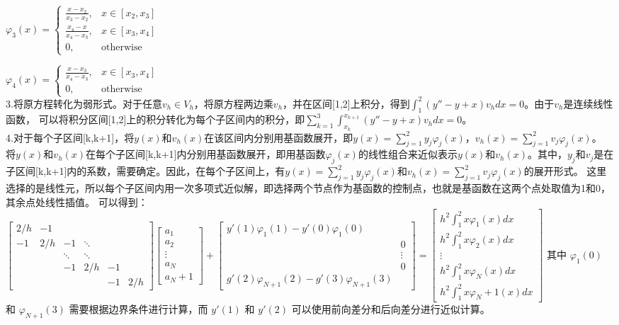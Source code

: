 \documentclass[12pt, a4paper, oneside]{ctexart}
\begin{document}
\begin{spacing}{2.0}
$\varphi_3(x)=\begin{cases}
    \frac{x-x_2}{x_3-x_2}, & x\in[x_2,x_3]\\
    \frac{x_4-x}{x_4-x_3}, & x\in[x_3,x_4]\\
    0, & \text{otherwise}
\end{cases}$

$\varphi_4(x)=\begin{cases}
    \frac{x-x_3}{x_4-x_3}, & x\in[x_3,x_4]\\
    0, & \text{otherwise}
\end{cases}$
\\
3.将原方程转化为弱形式。对于任意$v_h\in V_h$，将原方程两边乘$v_h$，并在区间[1,2]上积分，得到$\int_1^2(y''-y+x)v_hdx=0$。由于$v_h$是连续线性函数，
可以将积分区间[1,2]上的积分转化为每个子区间内的积分，即$\displaystyle\sum_{k=1}^{3}\int_{x_k}^{x_{k+1}}(y''-y+x)v_hdx=0$。
\\
4.对于每个子区间[k,k+1]，将$y(x)$和$v_h(x)$在该区间内分别用基函数展开，即$\displaystyle y(x)=\sum_{j=1}^{2}y_j\varphi_j(x)$，$ \displaystyle v_h(x)=\sum_{j=1}^{2}v_j\varphi_j(x)$。
将$y(x)$和$v_h(x)$在每个子区间[k,k+1]内分别用基函数展开，即用基函数$\varphi_j(x)$的线性组合来近似表示$y(x)$和$v_h(x)$。其中，$y_j$和$v_j$是在
子区间[k,k+1]内的系数，需要确定。因此，在每个子区间上，有$\displaystyle y(x)=\sum_{j=1}^{2}y_j\varphi_j(x)$和$\displaystyle v_h(x)=\sum_{j=1}^{2}v_j\varphi_j(x)$的展开形式。
这里选择的是线性元，所以每个子区间内用一次多项式近似解，即选择两个节点作为基函数的控制点，也就是基函数在这两个点处取值为1和0，其余点处线性插值。
可以得到：
$\displaystyle\begin{bmatrix}2/h&-1\\ -1&2/h&-1&\ddots\\ &&\ddots&\ddots\\ &&-1&2/h&-1\\ &&&&-1&2/h\end{bmatrix}\begin{bmatrix}a_1\\ a_2\\ \vdots\\ a_N\\ a_N+1\end{bmatrix} + 
\begin{bmatrix}y'(1)\varphi_1(1)-y'(0)\varphi_1(0)\\ &0\\ &\vdots\\ &0\\ g'(2)\varphi_{N+1}(2)-g'(3)\varphi_{N+1}(3)\end{bmatrix} = 
\begin{bmatrix}h^2\int_1^2x\varphi_1(x)dx\\ h^2\int_1^2x\varphi_2(x)dx\\ \vdots\\ h^2\int_1^2x\varphi_N(x)dx\\ h^2\int_1^2x\varphi_N+1(x)dx\end{bmatrix}$ 
其中 $\varphi_{1}(0)$ 和 $\varphi_{N+1}(3)$ 需要根据边界条件进行计算，而 $y'(1)$ 和 $y'(2)$ 可以使用前向差分和后向差分进行近似计算。


\end{spacing}
\end{document}
